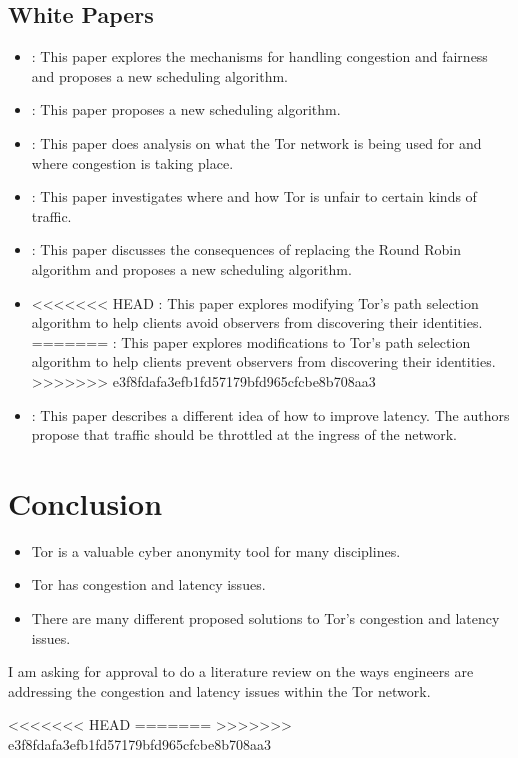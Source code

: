 \documentclass[letterpaper,13pt]{texMemo}
\begin{document}
\subsection*{White Papers}
\begin{itemize}
    \item
    \citeauthor*{unfair}: This paper explores the mechanisms for handling congestion
    and fairness and proposes a new scheduling algorithm.
    \item
    \citeauthor*{Tang}: This paper proposes a new scheduling algorithm.
    \item
    \citeauthor*{analysis}: This paper does analysis on what the Tor network is being used for and where congestion is taking place.
    \item
    \citeauthor*{delay}: This paper investigates where and how Tor is unfair to certain kinds of traffic.
    \item
    \citeauthor*{Bauer}: This paper discusses the consequences of replacing the Round Robin algorithm and
    proposes a new scheduling algorithm.
    \item
<<<<<<< HEAD
    \citeauthor*{Edman}: This paper explores modifying Tor's path selection algorithm to help
    clients avoid observers from discovering their identities.
=======
    \citeauthor*{Edman}: This paper explores modifications to Tor's path selection algorithm to help
    clients prevent observers from discovering their identities.
>>>>>>> e3f8fdafa3efb1fd57179bfd965cfcbe8b708aa3
    \item
    \citeauthor*{Moore}: This paper describes a different idea of how to improve latency. The
    authors propose that traffic should be throttled at the ingress of the network.

\end{itemize}


{\section*{Conclusion}}
\begin{itemize}
    \item
    Tor is a valuable cyber anonymity tool for many disciplines.
    \item
    Tor has congestion and latency issues.
    \item
    There are many different proposed solutions to Tor's congestion and latency issues.
\end{itemize}
I am asking for approval to do a literature review on the ways engineers are addressing the
congestion and latency issues within the Tor network.

\newpage

<<<<<<< HEAD
%
=======
\center \renewcommand\refname{Work Cited\\ }
>>>>>>> e3f8fdafa3efb1fd57179bfd965cfcbe8b708aa3

\end{document}
